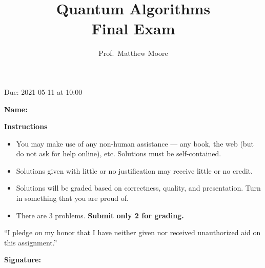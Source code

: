 \documentclass[oneside]{amsart}  %
\theoremstyle{plain}
\theoremstyle{definition}
\theoremstyle{remark}
\numberwithin{equation}{section}  %
\newif\ifsolutions
\begin{document}
\title[Quantum Algorithms, Final Exam]{Quantum Algorithms \\ Final Exam}
\author{Prof.~Matthew Moore}
\maketitle

\thispagestyle{empty} \setcounter{page}{0}

\vspace{-0.7em} \begin{center}
  \sc Due: 2021-05-11 at 10:00
\end{center}

\vspace{4em}

\noindent \textbf{Name:} \underline{\hspace{20em}}

\vspace{2em}

\noindent \textbf{Instructions} %
\begin{itemize}[itemsep=0.5em, topsep=\itemsep]
  \item You may make use of any non-human assistance --- any book, the web
    (but do not ask for help online), etc. Solutions must be self-contained.

  \item Solutions given with little or no justification may receive little
    or no credit.

  \item Solutions will be graded based on correctness, quality, and
    presentation. Turn in something that you are proud of.

  \item There are 3 problems. \textbf{Submit only 2 for grading.}
\end{itemize}

\vspace{2em}

\noindent ``I pledge on my honor that I have neither given nor received
unauthorized aid on this assignment.''

\vspace{4em}

\noindent \textbf{Signature:} \underline{\hspace{20em}}
\end{document}
